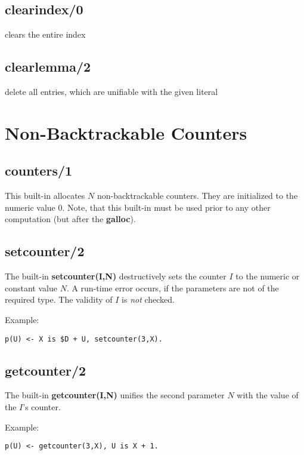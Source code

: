 \subsection{clearindex/0}
clears the entire index
\subsection{clearlemma/2}
delete all entries, which are unifiable with the given literal

\section{Non-Backtrackable Counters}

\subsection{counters/1}
This built-in allocates $N$ non-backtrackable counters. They are
initialized to the numeric value $0$.
Note, that this built-in must be used prior to any other computation
(but after the {\bf galloc}).

\subsection{setcounter/2}

The built-in {\bf setcounter(I,N)} destructively sets the counter $I$
to the numeric or constant value $N$. A run-time error occurs, if
the parameters are not of the required type.
The validity of $I$ is {\em not\/} checked.

Example:
\begin{verbatim}
p(U) <- X is $D + U, setcounter(3,X).
\end{verbatim}

\subsection{getcounter/2}

The built-in {\bf getcounter(I,N)} unifies the second parameter $N$
with the value of the $I$'s counter.

Example:
\begin{verbatim}
p(U) <- getcounter(3,X), U is X + 1.
\end{verbatim}


